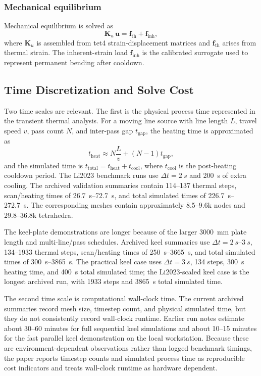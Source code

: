   \subsubsection{Mechanical equilibrium}
  Mechanical equilibrium is solved as
  \begin{equation}
  \mathbf{K}_u\,\mathbf{u} = \mathbf{f}_{\mathrm{th}} + \mathbf{f}_{\mathrm{inh}},
  \end{equation}
  where $\mathbf{K}_u$ is assembled from tet4 strain-displacement matrices and $\mathbf{f}_{\mathrm{th}}$ arises from thermal strain. The inherent-strain load $\mathbf{f}_{\mathrm{inh}}$ is the calibrated surrogate used to represent permanent bending after cooldown.

  \subsection{Time Discretization and Solve Cost}
  \label{sec:time-aspect}

  Two time scales are relevant. The first is the physical process time represented in the transient thermal analysis. For a moving line source with line length $L$, travel speed $v$, pass count $N$, and inter-pass gap $t_{\mathrm{gap}}$, the heating time is approximated as
  \begin{equation}
  t_{\mathrm{heat}} \approx N\frac{L}{v} + (N-1)t_{\mathrm{gap}},
  \end{equation}
  and the simulated time is $t_{\mathrm{total}}=t_{\mathrm{heat}}+t_{\mathrm{cool}}$, where $t_{\mathrm{cool}}$ is the post-heating cooldown period. The Li2023 benchmark runs use $\Delta t=\SI{2}{s}$ and \SI{200}{s} of extra cooling. The archived validation summaries contain 114--137 thermal steps, scan/heating times of \SIrange{26.7}{72.7}{s}, and total simulated times of \SIrange{226.7}{272.7}{s}. The corresponding meshes contain approximately 8.5--9.6k nodes and 29.8--36.8k tetrahedra.

  The keel-plate demonstrations are longer because of the larger \SI{3000}{mm} plate length and multi-line/pass schedules. Archived keel summaries use $\Delta t=\SIrange{2}{3}{s}$, 134--1933 thermal steps, scan/heating times of \SIrange{250}{3665}{s}, and total simulated times of \SIrange{300}{3865}{s}. The practical keel case uses $\Delta t=\SI{3}{s}$, 134 steps, \SI{300}{s} heating time, and \SI{400}{s} total simulated time; the Li2023-scaled keel case is the longest archived run, with 1933 steps and \SI{3865}{s} total simulated time.

  The second time scale is computational wall-clock time. The current archived summaries record mesh size, timestep count, and physical simulated time, but they do not consistently record wall-clock runtime. Earlier run notes estimate about 30--60 minutes for full sequential keel simulations and about 10--15 minutes for the fast parallel keel demonstration on the local workstation. Because these are environment-dependent observations rather than logged benchmark timings, the paper reports timestep counts and simulated process time as reproducible cost indicators and treats wall-clock runtime as hardware dependent.

